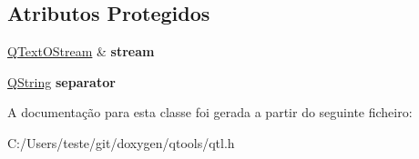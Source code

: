 \subsection*{Atributos Protegidos}
\begin{DoxyCompactItemize}
\item 
\hypertarget{class_q_text_o_stream_iterator_a49da1bcb72cb03b509dfc211ed844dd6}{\hyperlink{class_q_text_o_stream}{Q\-Text\-O\-Stream} \& {\bfseries stream}}\label{class_q_text_o_stream_iterator_a49da1bcb72cb03b509dfc211ed844dd6}

\item 
\hypertarget{class_q_text_o_stream_iterator_a59d6f5c9463dcd83bdd316a216ad75fc}{\hyperlink{class_q_string}{Q\-String} {\bfseries separator}}\label{class_q_text_o_stream_iterator_a59d6f5c9463dcd83bdd316a216ad75fc}

\end{DoxyCompactItemize}


A documentação para esta classe foi gerada a partir do seguinte ficheiro\-:\begin{DoxyCompactItemize}
\item 
C\-:/\-Users/teste/git/doxygen/qtools/qtl.\-h\end{DoxyCompactItemize}
